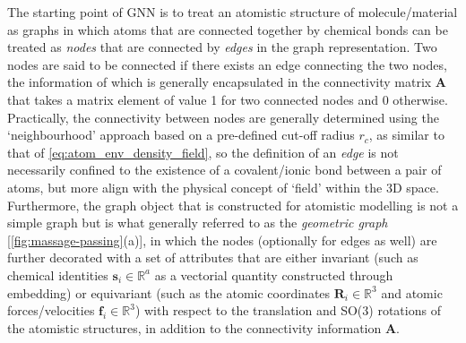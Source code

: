 The starting point of GNN is to treat an atomistic structure of molecule/material as graphs in which atoms that are connected together by chemical bonds can be treated as \emph{nodes} that are connected by \emph{edges} in the graph representation. Two nodes are said to be connected if there exists an edge connecting the two nodes, the information of which is generally encapsulated in the connectivity matrix $\bm{A}$ that takes a matrix element of value 1 for two connected nodes and 0 otherwise. Practically, the connectivity between nodes are generally determined using the `neighbourhood' approach based on a pre-defined cut-off radius  $r_c$,  as  similar to that of \cref{eq:atom_env_density_field}, so the definition of an \emph{edge} is not necessarily confined to the existence of a covalent/ionic bond between a pair of atoms, but more align with the physical concept of `field' within the 3D space.  Furthermore, the graph object that is constructed for atomistic modelling is not a simple graph but is what generally referred to as the \emph{geometric graph} [\cref{fig:massage-passing}(a)], in which the nodes (optionally for edges as well) are further decorated with  a set of attributes that are either invariant (such as chemical identities $\bm{s}_i\in\mathbb{R}^a$ as a vectorial quantity constructed through embedding) or equivariant (such as the atomic coordinates $\bm{R}_i\in\mathbb{R}^3$ and atomic forces/velocities  $\bm{f}_i\in\mathbb{R}^3$) with respect to the translation and SO(3) rotations of the atomistic structures, in addition to the connectivity information $\bm{A}$.

